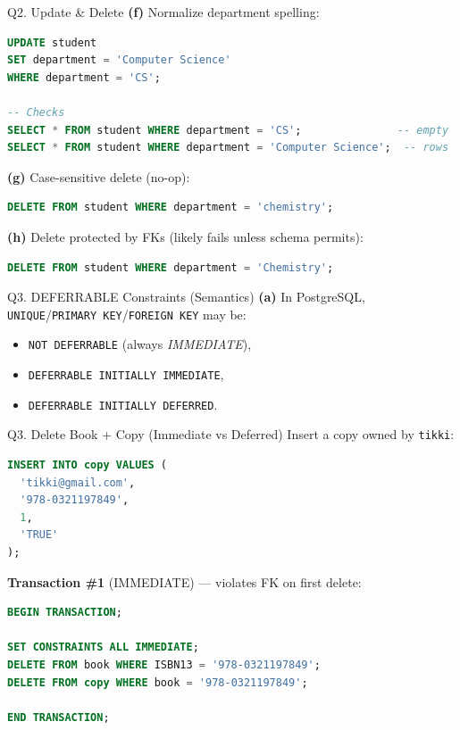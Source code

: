 \documentclass{beamer}
\begin{document}
\begin{frame}[fragile]{Q2. Update \& Delete}
\textbf{(f)} Normalize department spelling:
\begin{lstlisting}[language=SQL]
UPDATE student
SET department = 'Computer Science'
WHERE department = 'CS';

-- Checks
SELECT * FROM student WHERE department = 'CS';               -- empty
SELECT * FROM student WHERE department = 'Computer Science';  -- rows
\end{lstlisting}

\textbf{(g)} Case-sensitive delete (no-op):
\begin{lstlisting}[language=SQL]
DELETE FROM student WHERE department = 'chemistry';
\end{lstlisting}

\textbf{(h)} Delete protected by FKs (likely fails unless schema permits):
\begin{lstlisting}[language=SQL]
DELETE FROM student WHERE department = 'Chemistry';
\end{lstlisting}
\end{frame}

\begin{frame}{Q3. DEFERRABLE Constraints (Semantics)}
\textbf{(a)} In PostgreSQL, \texttt{UNIQUE}/\texttt{PRIMARY KEY}/\texttt{FOREIGN KEY} may be:
\begin{itemize}
  \item \texttt{NOT DEFERRABLE} (always \textit{IMMEDIATE}),
  \item \texttt{DEFERRABLE INITIALLY IMMEDIATE},
  \item \texttt{DEFERRABLE INITIALLY DEFERRED}.
\end{itemize}
\end{frame}

\begin{frame}[fragile]{Q3. Delete Book + Copy (Immediate vs Deferred)}
Insert a copy owned by \texttt{tikki}:
\begin{lstlisting}[language=SQL]
INSERT INTO copy VALUES (
  'tikki@gmail.com',
  '978-0321197849',
  1,
  'TRUE'
);
\end{lstlisting}

\textbf{Transaction \#1} (IMMEDIATE) — violates FK on first delete:
\begin{lstlisting}[language=SQL]
BEGIN TRANSACTION;

SET CONSTRAINTS ALL IMMEDIATE;
DELETE FROM book WHERE ISBN13 = '978-0321197849';
DELETE FROM copy WHERE book = '978-0321197849';

END TRANSACTION;
\end{lstlisting}
\end{frame}
\end{document}
